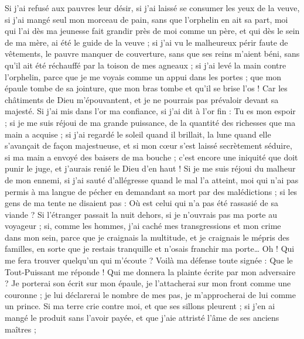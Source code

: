 \begin{multicols}{2}
Si j'ai refusé aux pauvres leur désir, si j'ai laissé se consumer les yeux de la veuve,
si j'ai mangé seul mon morceau de pain, sans que l'orphelin en ait sa part,
moi qui l'ai dès ma jeunesse fait grandir près de moi comme un père, et qui dès le sein de ma mère, ai été le guide de la veuve ;
si j'ai vu le malheureux périr faute de vêtements, le pauvre manquer de couverture,
sans que ses reins m'aient béni, sans qu'il ait été réchauffé par la toison de mes agneaux ;
si j'ai levé la main contre l'orphelin, parce que je me voyais comme un appui dans les portes ;
que mon épaule tombe de sa jointure, que mon bras tombe et qu'il se brise l'os !
Car les châtiments de Dieu m'épouvantent, et je ne pourrais pas prévaloir devant sa majesté.
Si j'ai mis dans l'or ma confiance, si j'ai dit à l'or fin : Tu es mon espoir ;
si je me suis réjoui de ma grande puissance, de la quantité des richesses que ma main a acquise ;
si j'ai regardé le soleil quand il brillait, la lune quand elle s'avançait de façon majestueuse,
et si mon cœur s'est laissé secrètement séduire, si ma main a envoyé des baisers de ma bouche ;
c'est encore une iniquité que doit punir le juge, et j'aurais renié le Dieu d'en haut !
Si je me suis réjoui du malheur de mon ennemi, si j'ai sauté d'allégresse quand le mal l'a atteint,
moi qui n'ai pas permis à ma langue de pécher en demandant sa mort par des malédictions ;
si les gens de ma tente ne disaient pas : Où est celui qui n'a pas été rassasié de sa viande ?
Si l'étranger passait la nuit dehors, si je n'ouvrais pas ma porte au voyageur ;
si, comme les hommes, j'ai caché mes transgressions et mon crime dans mon sein,
parce que je craignais la multitude, et je craignais le mépris des familles, en sorte que je restais tranquille et n'osais franchir ma porte…
Oh ! Qui me fera trouver quelqu'un qui m'écoute ? Voilà ma défense toute signée : Que le Tout-Puissant me réponde ! Qui me donnera la plainte écrite par mon adversaire ?
Je porterai son écrit sur mon épaule, je l'attacherai sur mon front comme une couronne ;
je lui déclarerai le nombre de mes pas, je m'approcherai de lui comme un prince.
Si ma terre crie contre moi, et que ses sillons pleurent ;
si j'en ai mangé le produit sans l'avoir payée, et que j'aie attristé l'âme de ses anciens maîtres ;

\end{multicols}

